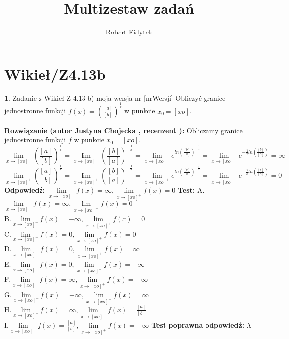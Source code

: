 \documentclass[12pt, a4paper]{article}
\title{Multizestaw zadań}
\author{Robert Fidytek}
\date{}
\theoremstyle{definition} %
\newtheorem{zad}{}
\newcommand{\kategoria}[1]{\section{#1}} %
\newcommand{\zadStart}[1]{\begin{zad}#1\newline} %
\newcommand{\zadStop}{\end{zad}}   %
\newcommand{\rozwStart}[2]{\noindent \textbf{Rozwiązanie (autor #1 , recenzent #2): }\newline} %
\newcommand{\rozwStop}{\newline}                                            %
\newcommand{\odpStart}{\noindent \textbf{Odpowiedź:}\newline}    %
\newcommand{\odpStop}{\newline}                                             %
\newcommand{\testStart}{\noindent \textbf{Test:}\newline} %
\newcommand{\testStop}{\newline} %
\newcommand{\kluczStart}{\noindent \textbf{Test poprawna odpowiedź:}\newline} %
\newcommand{\kluczStop}{\newline} %
\begin{document}
\maketitle


\kategoria{Wikieł/Z4.13b}
\zadStart{Zadanie z Wikieł Z 4.13 b) moja wersja nr [nrWersji]}
Obliczyć granice jednostronne funkcji $f(x)=\left(\frac{[a]}{[b]}\right)^{\frac{1}{x}}$ w punkcie $x_{0}=[xo]$. 
\zadStop
\rozwStart{Justyna Chojecka}{}
Obliczamy granice jednostronne funkcji $f$ w punkcie $x_{0}=[xo]$.
$$\lim\limits_{x\to [xo]^{-}}\left(\frac{[a]}{[b]}\right)^{\frac{1}{x}}=\lim\limits_{x\to [xo]^{-}}\left(\frac{[b]}{[a]}\right)^{-\frac{1}{x}}=\lim\limits_{x\to [xo]^{-}}e^{ln\left(\frac{[b]}{[a]}\right)^{-\frac{1}{x}}}=\lim\limits_{x\to [xo]^{-}}e^{-\frac{1}{x}ln\left(\frac{[b]}{[a]}\right)}=\infty$$
$$\lim\limits_{x\to [xo]^{+}}\left(\frac{[a]}{[b]}\right)^{\frac{1}{x}}=\lim\limits_{x\to [xo]^{+}}\left(\frac{[b]}{[a]}\right)^{-\frac{1}{x}}=\lim\limits_{x\to [xo]^{+}}e^{ln\left(\frac{[b]}{[a]}\right)^{-\frac{1}{x}}}=\lim\limits_{x\to [xo]^{+}}e^{-\frac{1}{x}ln\left(\frac{[b]}{[a]}\right)}=0$$
\rozwStop
\odpStart
$\lim\limits_{x\to [xo]^{-}}f(x)=\infty, \lim\limits_{x\to [xo]^{+}}f(x)=0$
\odpStop
\testStart
A.$\lim\limits_{x\to [xo]^{-}}f(x)=\infty, \lim\limits_{x\to [xo]^{+}}f(x)=0$\\
B.$\lim\limits_{x\to [xo]^{-}}f(x)=-\infty, \lim\limits_{x\to [xo]^{+}}f(x)=0$\\
C.$\lim\limits_{x\to [xo]^{-}}f(x)=0, \lim\limits_{x\to [xo]^{+}}f(x)=0$\\
D.$\lim\limits_{x\to [xo]^{-}}f(x)=0, \lim\limits_{x\to [xo]^{+}}f(x)=\infty$\\
E.$\lim\limits_{x\to [xo]^{-}}f(x)=0, \lim\limits_{x\to [xo]^{+}}f(x)=-\infty$\\
F.$\lim\limits_{x\to [xo]^{-}}f(x)=\infty, \lim\limits_{x\to [xo]^{+}}f(x)=-\infty$\\
G.$\lim\limits_{x\to [xo]^{-}}f(x)=-\infty, \lim\limits_{x\to [xo]^{+}}f(x)=\infty$\\
H.$\lim\limits_{x\to [xo]^{-}}f(x)=\infty, \lim\limits_{x\to [xo]^{+}}f(x)=\frac{[a]}{[b]}$\\
I.$\lim\limits_{x\to [xo]^{-}}f(x)=\frac{[a]}{[b]}, \lim\limits_{x\to [xo]^{+}}f(x)=-\infty$
\testStop
\kluczStart
A
\kluczStop
\end{document}

